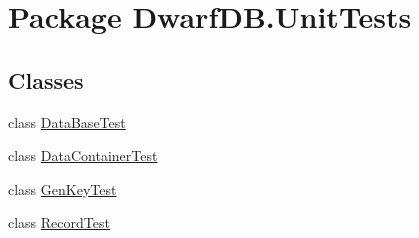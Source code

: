 \hypertarget{namespace_dwarf_d_b_1_1_unit_tests}{\section{Package Dwarf\+D\+B.\+Unit\+Tests}
\label{namespace_dwarf_d_b_1_1_unit_tests}
}
\subsection*{Classes}
\begin{DoxyCompactItemize}
\item 
class \hyperlink{class_dwarf_d_b_1_1_unit_tests_1_1_data_base_test}{Data\+Base\+Test}
\item 
class \hyperlink{class_dwarf_d_b_1_1_unit_tests_1_1_data_container_test}{Data\+Container\+Test}
\item 
class \hyperlink{class_dwarf_d_b_1_1_unit_tests_1_1_gen_key_test}{Gen\+Key\+Test}
\item 
class \hyperlink{class_dwarf_d_b_1_1_unit_tests_1_1_record_test}{Record\+Test}
\end{DoxyCompactItemize}
